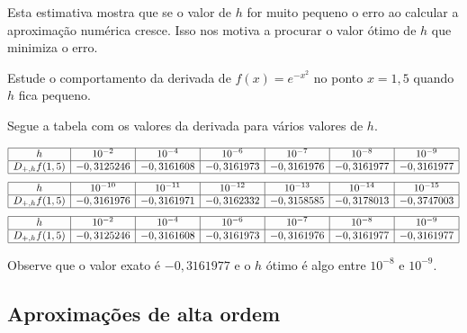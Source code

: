 Esta estimativa mostra que se o valor de $h$ for muito pequeno o erro ao calcular a aproximação numérica cresce. Isso nos motiva a procurar o valor ótimo de $h$ que minimiza o erro.

\begin{ex}Estude o comportamento da derivada de $f(x)=e^{-x^2}$ no ponto $x=1,5$ quando $h$ fica pequeno.
\end{ex}
\begin{sol}
Segue a tabela com os valores da derivada para vários valores de $h$.
\begin{tiny}
\begin{equation*}
\begin{array}{|c|c|c|c|c|c|c|}
\hline
h&10^{-2}&10^{-4}&10^{-6}&10^{-7}&10^{-8}&10^{-9}\\
\hline
D_{+,h}f(1,5)& - 0,3125246&- 0,3161608 &- 0,3161973&- 0,3161976&- 0,3161977&- 0,3161977 \\
\hline
\end{array}  
\end{equation*}  
\begin{equation*}
\begin{array}{|c|c|c|c|c|c|c|}
\hline
h&10^{-10}&10^{-11}&10^{-12}&10^{-13}&10^{-14}&10^{-15}\\
\hline
D_{+,h}f(1,5)&- 0,3161976&- 0,3161971&- 0,3162332&- 0,3158585&- 0,3178013&- 0,3747003\\
\hline
\end{array}
\end{equation*}
\begin{equation*}
\begin{array}{|c|c|c|c|c|c|c|}
\hline
h&10^{-2}&10^{-4}&10^{-6}&10^{-7}&10^{-8}&10^{-9}\\
\hline
D_{+,h}f(1,5)& - 0,3125246&- 0,3161608 &- 0,3161973&- 0,3161976&- 0,3161977&- 0,3161977 \\
\hline
\end{array}  
\end{equation*}
\end{tiny}

Observe que o valor exato é $-0,3161977$ e o $h$ ótimo é algo entre $10^{-8}$ e $10^{-9}$.  
\end{sol}


\subsection{Aproximações de alta ordem}

